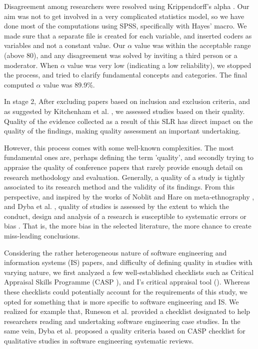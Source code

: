 \documentclass{ieeeaccess}
\begin{document}
Disagreement among researchers were resolved using Krippendorff’s alpha \cite{krippendorff2011computing}. Our aim was not to get involved in a very complicated statistics model, so we have done most of the computations using SPSS, specifically with Hayes’ macro. We made sure that a separate file is created for each variable, and inserted coders as variables and not a constant value. Our $ \alpha $ value was within the acceptable range (above 80), and any disagreement was solved by inviting a third person or a moderator. When $ \alpha $ value was very low (indicating a low reliability), we stopped the process, and tried to clarify fundamental concepts and categories. The final computed $ \alpha $ value was 89.9\%. 

In stage 2, After excluding papers based on inclusion and exclusion criteria, and as suggested by Kitchenham et al. \cite{kitchenham2015evidence}, we assessed studies based on their quality. Quality of the evidence collected as a result of this SLR has direct impact on the quality of the findings, making quality assessment an important undertaking.

However, this process comes with some well-known complexities. The most fundamental ones are, perhaps defining the term 'quality', and secondly trying to appraise the quality of conference papers that rarely provide enough detail on research methodology and evaluation. Generally, a quality of a study is tightly associated to its research method and the validity of its findings. From this perspective, and inspired by the works of Noblit and Hare on meta-ethnography \cite{noblit1988meta}, and Dyba et al. \cite{dybaa2008empirical}, quality of studies is assessed by the extent to which the conduct, design and analysis of a research is susceptible to systematic errors or bias \cite{cumpston2019updated}. That is, the more bias in the selected literature, the more chance to create miss-leading conclusions.

Considering the rather heterogeneous nature of software engineering and information systems (IS) papers, and difficulty of defining quality in studies with varying nature, we first analyzed a few well-established checklists such as Critical Appraisal Skills Programme (CASP \cite{tools2018checklists}), and  I's critical appraisal tool (\cite{JBI}). Whereas these checklists could potentially account for the requirements of this study, we opted for something that is more specific to software engineering and IS. We realized for example that, Runeson et al. \cite{runeson2006we} provided a checklist designated to help researchers reading and undertaking software engineering case studies. In the same vein, Dyba et al. \cite{dybaa2008empirical} proposed a quality criteria based on CASP checklist for qualitative studies in software engineering systematic reviews. 
\end{document}
